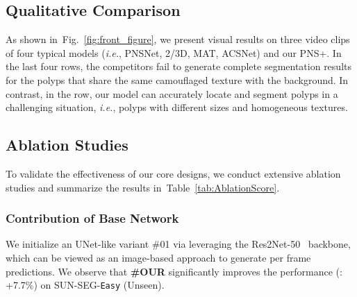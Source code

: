 \documentclass[default,iicol]{sn-jnl}
\theoremstyle{thmstyleone}
\theoremstyle{thmstyletwo}
\theoremstyle{thmstylethree}
\newcommand{\figref}[1]{Fig.~\ref{#1}}
\newcommand{\tabref}[1]{Table~\ref{#1}}
\def\ie{\emph{i.e.}}
\def\ourmodel{PNS+}
\def\ourdataset{SUN-SEG}
\begin{document}
\subsection{Qualitative Comparison}
As shown in~\figref{fig:front_figure}, we present visual results on three video clips of four typical models (\ie, PNSNet, 2/3D, MAT, ACSNet) and our \ourmodel.
In the last four rows, the competitors fail to generate complete segmentation results for the polyps that share the same camouflaged texture with the background.
In contrast, in the  row, our model can accurately locate and segment polyps in a challenging situation, \ie, polyps with different sizes and homogeneous textures.

\subsection{Ablation Studies}\label{sec:ablation}
To validate the effectiveness of our core designs, we conduct extensive ablation studies and summarize the results in~\tabref{tab:AblationScore}.

\subsubsection{Contribution of Base Network}
We initialize an UNet-like variant \#01 via leveraging the Res2Net-50~\cite{pami20Res2net} backbone, which can be viewed as an image-based approach to generate per frame predictions.
We observe that \textbf{\#OUR} significantly improves the performance (: +7.7\%) on \ourdataset-\texttt{Easy} (Unseen).
\end{document}
